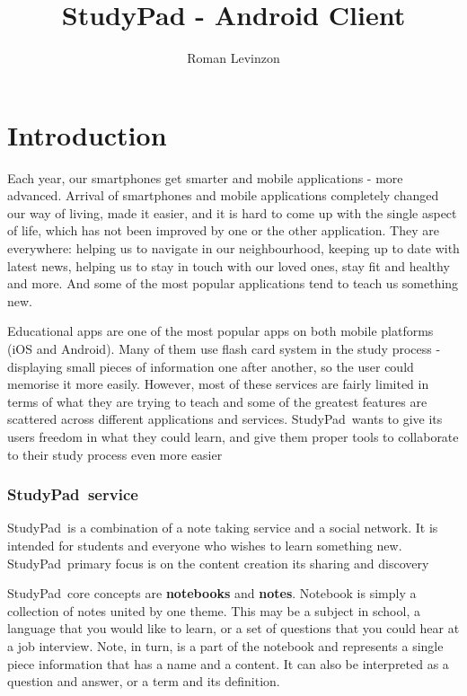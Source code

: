\documentclass[thesis=B,english]{FITthesis}[2012/10/20]
\title{StudyPad - Android Client}
\author{Roman Levinzon} %
\newcommand{\appname}{StudyPad}
\begin{document}

\chapter{Introduction}

Each year, our smartphones get smarter and mobile applications - more advanced. Arrival of smartphones and mobile applications completely changed our way of living, made it easier, and it is hard to come up with the single aspect of life, which has not been improved by one or the other application. They are everywhere: helping us to navigate in our neighbourhood, keeping up to date with latest news, helping us to stay in touch with our loved ones, stay  fit and healthy and more. And some of the most popular applications tend to teach us something new.	

Educational apps are one of the most popular apps on both mobile platforms (iOS and Android). Many of them use flash card system in the study process - displaying small pieces of information one after another, so the user could memorise it more easily. However, most of these services are fairly limited in terms of what they are trying to teach and some of the greatest  features are scattered across different applications and services. \appname\ wants to give its users freedom in what they could learn, and give them proper tools to collaborate to their study process even more easier

\subsection{\appname\ service}
\appname\ is a combination of a note taking service and a social network. It is intended for students and everyone who wishes to learn something new. \appname\ primary focus is on the content creation its sharing and discovery

\appname\ core concepts are \textbf{notebooks} and \textbf{notes}. Notebook is simply a collection of notes united by one theme. This may be a subject in school, a language that you would like to learn, or a set of questions that you could hear at a job interview. Note, in turn, is a part of the notebook and represents a single piece information that has a name and a content. It can also be interpreted as a question and answer, or a term and its definition.
\end{document}
